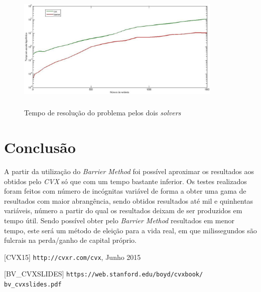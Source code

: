 \documentclass[a4paper]{IEEEtran}
\begin{document}
\begin{figure}[htp]
\captionsetup{font=scriptsize}  
 \raggedright
  \begin{minipage}{5cm}
 \includegraphics[width=9.8cm, height=6cm, left]{./tempo_metodos}
  \end{minipage}
  \caption{Tempo de resolução do problema pelos dois \textit{solvers}}
    \label{fig:tempometodos}
\end{figure}


\section{Conclusão}
\label{sec:conclusion}

A partir da utilização do \textit{Barrier Method} foi possível aproximar os resultados aos obtidos pelo \textit{CVX} só que com um tempo bastante inferior. Os testes realizados foram feitos com número de incógnitas variável de forma a obter uma gama de resultados com maior abrangência, sendo obtidos resultados até mil e quinhentas variáveis, número a partir do qual os resultados deixam de ser produzidos em tempo útil. Sendo possível obter pelo \textit{Barrier Method} resultados em menor tempo, este será um método de eleição para a vida real, em que milissegundos são fulcrais na perda/ganho de capital próprio.


\begin{thebibliography}{9}

  [CVX15] \texttt{http://cvxr.com/cvx}, Junho 2015
  
  [BV\_CVXSLIDES] \texttt{https://web.stanford.edu/boyd/cvxbook/ bv\_cvxslides.pdf}


\end{thebibliography}
\end{document}
